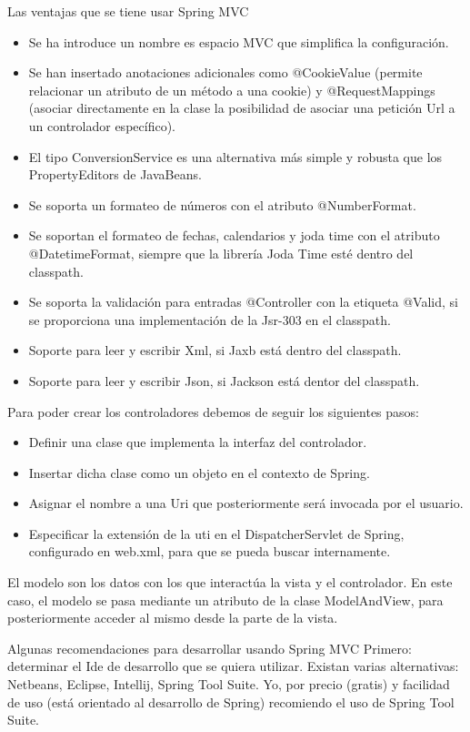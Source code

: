 \begin{itemize}
			Las ventajas que se tiene usar Spring MVC 
			\begin{itemize}
				\item Se ha introduce un nombre es espacio MVC que simplifica la configuración.
				\item Se han insertado anotaciones adicionales como @CookieValue (permite relacionar un atributo de un método a una cookie) y @RequestMappings (asociar directamente en la clase la posibilidad de asociar una petición Url a un controlador específico).
				\item El tipo ConversionService es una alternativa más simple y robusta que los PropertyEditors de JavaBeans.
				\item Se soporta un formateo de números con el atributo @NumberFormat.
				\item Se soportan el formateo de fechas, calendarios y joda time con el atributo @DatetimeFormat, siempre que la librería Joda Time esté dentro del classpath.
				\item Se soporta la validación para entradas @Controller con la etiqueta @Valid, si se proporciona una implementación de la Jsr-303 en el classpath.
				\item Soporte para leer y escribir Xml, si Jaxb está dentro del classpath.
				\item Soporte para leer y escribir Json, si Jackson está dentor del classpath.
			\end{itemize}
			Para poder crear los controladores debemos de seguir los siguientes pasos:
			\begin{itemize}
				\item Definir una clase que implementa la interfaz del controlador.
				\item Insertar dicha clase como un objeto en el contexto de Spring.
				\item Asignar el nombre a una Uri que posteriormente será invocada por el usuario.
				\item Especificar la extensión de la uti en el DispatcherServlet de Spring, configurado en web.xml, para que se pueda buscar internamente.
			\end{itemize}
			
			El modelo son los datos con los que interactúa la vista y el controlador. En este caso, el modelo se pasa mediante un atributo de la clase ModelAndView, para posteriormente acceder al mismo desde la parte de la vista. \cite{introspring}
			
			Algunas recomendaciones para desarrollar usando Spring MVC
			Primero: determinar el Ide de desarrollo que se quiera utilizar. Existan varias alternativas: Netbeans, Eclipse, Intellij, Spring Tool Suite. Yo, por precio (gratis) y facilidad de uso (está orientado al desarrollo de Spring) recomiendo el uso de Spring Tool Suite. \\
			

\end{itemize}
